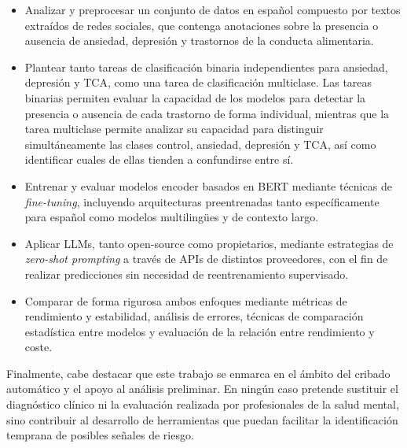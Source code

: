 \begin{itemize}
	\item Analizar y preprocesar un conjunto de datos en español compuesto por textos extraídos de redes sociales, que contenga anotaciones sobre la presencia o ausencia de ansiedad, depresión y trastornos de la conducta alimentaria.
	
	\item Plantear tanto tareas de clasificación binaria independientes para ansiedad, depresión y \ac{TCA}, como una tarea de clasificación multiclase. Las tareas binarias permiten evaluar la capacidad de los modelos para detectar la presencia o ausencia de cada trastorno de forma individual, mientras que la tarea multiclase permite analizar su capacidad para distinguir simultáneamente las clases control, ansiedad, depresión y \ac{TCA}, así como identificar cuales de ellas tienden a confundirse entre sí.
	
	\item Entrenar y evaluar modelos encoder basados en \ac{BERT} mediante técnicas de \textit{fine-tuning}, incluyendo arquitecturas preentrenadas tanto específicamente para español como modelos multilingües y de contexto largo.
	
	\item Aplicar \acp{LLM}, tanto open-source como propietarios, mediante estrategias de \textit{zero-shot prompting} a través de \acp{API} de distintos proveedores, con el fin de realizar predicciones sin necesidad de reentrenamiento supervisado.
	
	\item Comparar de forma rigurosa ambos enfoques mediante métricas de rendimiento y estabilidad, análisis de errores, técnicas de comparación estadística entre modelos y evaluación de la relación entre rendimiento y coste.
\end{itemize}

Finalmente, cabe destacar que este trabajo se enmarca en el ámbito del cribado automático y el apoyo al análisis preliminar. En ningún caso pretende sustituir el diagnóstico clínico ni la evaluación realizada por profesionales de la salud mental, sino contribuir al desarrollo de herramientas que puedan facilitar la identificación temprana de posibles señales de riesgo.



